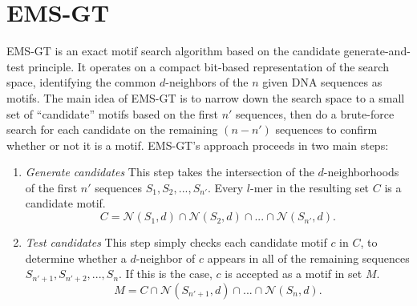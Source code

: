 \documentclass[oneside,12pt]{DISCSthesis}
\begin{document}
	\section{EMS-GT}
		EMS-GT \cite{nabos2015dissertation} is an exact motif search algorithm based on the candidate generate-and-test principle.
		It operates on a compact bit-based representation of the search space, identifying the common $d$-neighbors of the $n$ given DNA sequences as motifs. The main idea of EMS-GT is to narrow down the search space to a small set of ``candidate'' motifs based on the first $n'$ sequences, then do a brute-force search for each candidate on the remaining $(n - n')$ sequences to confirm whether or not it is a motif. 
		EMS-GT's approach proceeds in two main steps:
		\begin{enumerate} %
			\item {\em Generate candidates}\newline
			This step takes the intersection of the $d$-neighborhoods of the first $n'$ sequences $S_{1},S_{2},...,S_{n'}$. Every $l$-mer in the resulting set $C$ is a candidate motif.
				\begin{equation} C = \mathcal{N}(S_{1}, d) \cap \mathcal{N}(S_{2}, d) \cap...\cap \mathcal{N}(S_{n'}, d). \end{equation}
			\item {\em Test candidates}\newline
			This step simply checks each candidate motif $c$ in $C$, to determine whether a $d$-neighbor of $c$ appears in all of the remaining sequences $S_{n'+1},S_{n'+2},...,S_{n}$. If this is the case, $c$ is accepted as a motif in set $M$.
				\begin{equation} M = C \cap \mathcal{N}(S_{n'+1}, d) \cap...\cap \mathcal{N}(S_{n}, d). \end{equation}
			\end{enumerate}
\end{document}
